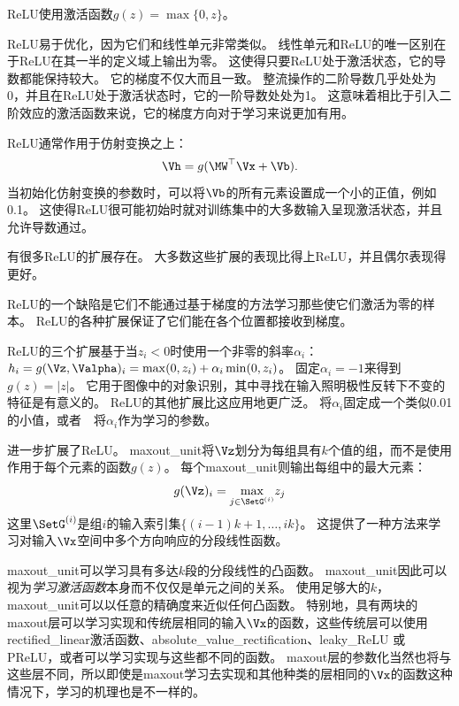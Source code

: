 \gls{ReLU}使用激活函数$g(z)=\max\{0, z\}$。

\gls{ReLU}易于优化，因为它们和线性单元非常类似。
线性单元和\gls{ReLU}的唯一区别在于\gls{ReLU}在其一半的定义域上输出为零。
这使得只要\gls{ReLU}处于激活状态，它的导数都能保持较大。
它的梯度不仅大而且一致。
整流操作的二阶导数几乎处处为0，并且在\gls{ReLU}处于激活状态时，它的一阶导数处处为1。
这意味着相比于引入二阶效应的激活函数来说，它的梯度方向对于学习来说更加有用。

\gls{ReLU}通常作用于仿射变换之上：
\begin{equation}
\Vh = g(\MW^\top \Vx + \Vb).
\end{equation}
当初始化仿射变换的参数时，可以将$\Vb$的所有元素设置成一个小的正值，例如0.1。
这使得\gls{ReLU}很可能初始时就对训练集中的大多数输入呈现激活状态，并且允许导数通过。

有很多\gls{ReLU}的扩展存在。
大多数这些扩展的表现比得上\gls{ReLU}，并且偶尔表现得更好。

\gls{ReLU}的一个缺陷是它们不能通过基于梯度的方法学习那些使它们激活为零的样本。
\gls{ReLU}的各种扩展保证了它们能在各个位置都接收到梯度。

\gls{ReLU}的三个扩展基于当$z_i<0$时使用一个非零的斜率$\alpha_i$：$h_i =g(\Vz, \Valpha)_i = \max(0, z_i) + \alpha_i \min(0, z_i)$。
固定$\alpha_i=-1$来得到$g(z)=|z|$。
它用于图像中的对象识别\citep{Jarrett-et-al-2009}，其中寻找在输入照明极性反转下不变的特征是有意义的。
\gls{ReLU}的其他扩展比这应用地更广泛。
\citep{Maas-et-al-2013}将$\alpha_i$固定成一个类似0.01的小值，或者~\textbf{}~将$\alpha_i$作为学习的参数\citep{He-et-al-2015}。


\citep{Goodfellow-et-al-2013a}进一步扩展了\gls{ReLU}。
\gls{maxout_unit}将$\Vz$划分为每组具有$k$个值的组，而不是使用作用于每个元素的函数$g(z)$。
每个\gls{maxout_unit}则输出每组中的最大元素：
\begin{equation}
g(\Vz)_i = \underset{j\in \SetG^{(i)}}{\max} z_j
\end{equation}
这里$\SetG^{(i)}$是组$i$的输入索引集$\{(i-1)k+1, \ldots, ik\}$。
这提供了一种方法来学习对输入$\Vx$空间中多个方向响应的分段线性函数。

\gls{maxout_unit}可以学习具有多达$k$段的分段线性的凸函数。
\gls{maxout_unit}因此可以视为\emph{学习激活函数}本身而不仅仅是单元之间的关系。
使用足够大的$k$，\gls{maxout_unit}可以以任意的精确度来近似任何凸函数。
特别地，具有两块的maxout层可以学习实现和传统层相同的输入$\Vx$的函数，这些传统层可以使用\gls{rectified_linear}激活函数、\gls{absolute_value_rectification}、\gls{leaky_ReLU} 或\gls{PReLU}，或者可以学习实现与这些都不同的函数。
maxout层的参数化当然也将与这些层不同，所以即使是maxout学习去实现和其他种类的层相同的$\Vx$的函数这种情况下，学习的机理也是不一样的。

